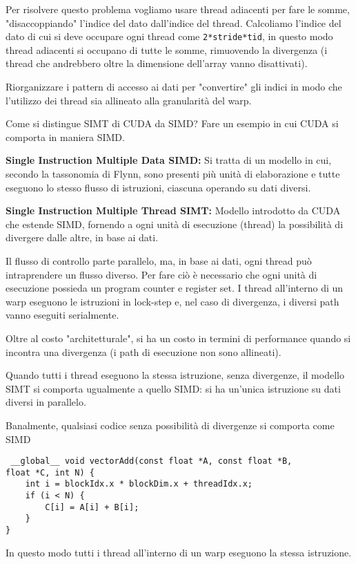 \begin{questions}
\begin{solution}
        Per risolvere questo problema vogliamo usare thread adiacenti per fare le somme, "disaccoppiando" l'indice del dato dall'indice del thread. Calcoliamo l'indice del dato di cui si deve occupare ogni thread come \texttt{2*stride*tid}, in questo modo thread adiacenti si occupano di tutte le somme, rimuovendo la divergenza (i thread che andrebbero oltre la dimensione dell'array vanno disattivati).
        
        Riorganizzare i pattern di accesso ai dati per "convertire" gli indici in modo che l'utilizzo dei thread sia allineato alla granularità del warp.
    \end{solution}
    
    \question Come si distingue SIMT di CUDA da SIMD? Fare un esempio in cui CUDA si comporta in maniera SIMD.
    
    \begin{solution}
        \textbf{Single Instruction Multiple Data SIMD:} Si tratta di un modello in cui, secondo la tassonomia di Flynn, sono presenti più unità di elaborazione e tutte eseguono lo stesso flusso di istruzioni, ciascuna operando su dati diversi.  
        
        \textbf{Single Instruction Multiple Thread SIMT:} Modello introdotto da CUDA che estende SIMD, fornendo a ogni unità di esecuzione (thread) la possibilità di divergere dalle altre, in base ai dati. 
        
        Il flusso di controllo parte parallelo, ma, in base ai dati, ogni thread può intraprendere un flusso diverso. Per fare ciò è necessario che ogni unità di esecuzione possieda un program counter e register set. I thread all'interno di un warp eseguono le istruzioni in lock-step e, nel caso di divergenza, i diversi path vanno eseguiti serialmente.
        
        Oltre al costo "architetturale", si ha un costo in termini di performance quando si incontra una divergenza (i path di esecuzione non sono allineati).
        
        Quando tutti i thread eseguono la stessa istruzione, senza divergenze, il modello SIMT si comporta ugualmente a quello SIMD: si ha un'unica istruzione su dati diversi in parallelo.
        
        Banalmente, qualsiasi codice senza possibilità di divergenze si comporta come SIMD
        \begin{verbatim}
 __global__ void vectorAdd(const float *A, const float *B, 
float *C, int N) {
    int i = blockIdx.x * blockDim.x + threadIdx.x;
    if (i < N) {
        C[i] = A[i] + B[i];
    }
}
        \end{verbatim}
        In questo modo tutti i thread all'interno di un warp eseguono la stessa istruzione.
    \end{solution}
    

\end{questions}

